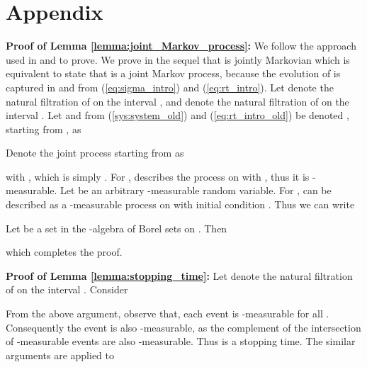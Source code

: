\documentclass[10.5pt,a4paper]{article}
\theoremstyle{remark}
\theoremstyle{plain}
\theoremstyle{plain}
\theoremstyle{remark}
\theoremstyle{plain}
\theoremstyle{plain}
\begin{document}
\section*{Appendix}

\textbf{Proof of Lemma  \ref{lemma:joint_Markov_process}:} 
We follow the approach used in \cite{hybridge}
and \cite{maobook} to prove. We prove in the sequel that 
is jointly Markovian which is equivalent to state that 
is a joint Markov process, because the evolution of  is
captured in  and  from (\ref{eq:sigma_intro})
and (\ref{eq:rt_intro}). Let  denote the natural filtration of
 on the interval , and 
denote the natural filtration of  on the interval
. Let  and  from (\ref{sys:system_old})
and (\ref{eq:rt_intro_old}) be denoted , starting from ,
as 

Denote the joint process  starting from
 as 

with ,
which is simply . For , 
describes the process on  with ,
thus it is -measurable. Let  be an arbitrary
-measurable random variable. For ,
 can be described as a -measurable
process on  with initial condition .
Thus we can write 

Let  be a set in the -algebra of Borel sets on .
Then 

which completes the proof. \hfill{}




\noindent \textbf{Proof of Lemma \ref{lemma:stopping_time}:} Let  denote
the natural filtration of  on the interval
. Consider 

 From the above argument, observe that, each event 
is -measurable for all .
Consequently the event  is also -measurable,
as the complement of the intersection of -measurable
events are also -measurable. Thus  is
a stopping time. The similar arguments are applied to \hfill{}



 
\end{document}
